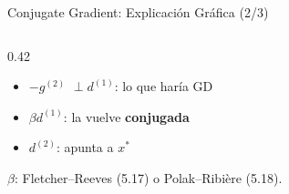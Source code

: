 \begin{frame}{Conjugate Gradient: Explicación Gráfica (2/3)}
\begin{columns}[T]
\begin{column}{0.42\textwidth}
            \begin{itemize}
                \item \textcolor{CelesteBrillante}{$-g^{(2)}$} $\perp d^{(1)}$: lo que haría GD
                \item \textcolor{VerdeNeon}{$\beta d^{(1)}$}: la vuelve \textbf{conjugada}
                \item \textcolor{NaranjaBase}{$d^{(2)}$}: apunta a $x^*$
            \end{itemize}
            \vspace{0.3em}
            {\scriptsize $\beta$: Fletcher--Reeves (5.17) o Polak--Ribière (5.18).\par}
        \end{column}
    \end{columns}
\end{frame}

